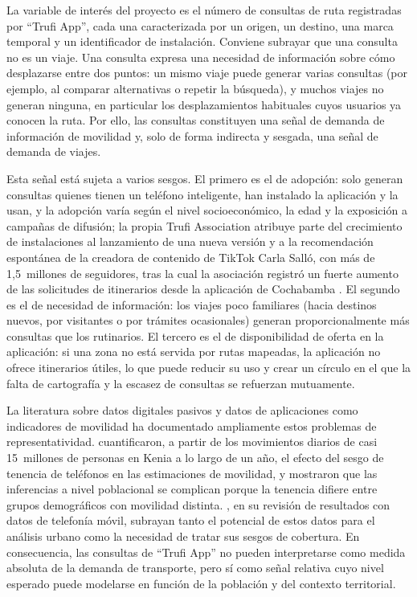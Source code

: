 La variable de interés del proyecto es el número de consultas de ruta registradas por ``Trufi App'', cada una caracterizada por un origen, un destino, una marca temporal y un identificador
de instalación. Conviene subrayar que una consulta no es un viaje. Una consulta expresa una
necesidad de información sobre cómo desplazarse entre dos puntos: un mismo viaje puede
generar varias consultas (por ejemplo, al comparar alternativas o repetir la búsqueda), y
muchos viajes no generan ninguna, en particular los desplazamientos habituales cuyos
usuarios ya conocen la ruta. Por ello, las consultas constituyen una señal de demanda de
información de movilidad y, solo de forma indirecta y sesgada, una señal de demanda de
viajes.

Esta señal está sujeta a varios sesgos. El primero es el de adopción: solo generan
consultas quienes tienen un teléfono inteligente, han instalado la aplicación y la usan, y
la adopción varía según el nivel socioeconómico, la edad y la exposición a campañas de
difusión; la propia Trufi Association atribuye parte del crecimiento de instalaciones al
lanzamiento de una nueva versión y a la recomendación espontánea de la creadora de
contenido de TikTok Carla Salló, con más de 1,5~millones de seguidores, tras la cual la
asociación registró un fuerte aumento de las solicitudes de itinerarios desde la aplicación
de Cochabamba \parencite{trufi-20000}. El segundo es el de necesidad de información: los
viajes poco familiares (hacia destinos nuevos, por visitantes o por trámites ocasionales)
generan proporcionalmente más consultas que los rutinarios. El tercero es el de
disponibilidad de oferta en la aplicación: si una zona no está servida por rutas mapeadas,
la aplicación no ofrece itinerarios útiles, lo que puede reducir su uso y crear un círculo
en el que la falta de cartografía y la escasez de consultas se refuerzan mutuamente.

La literatura sobre datos digitales pasivos y datos de aplicaciones como indicadores de
movilidad ha documentado ampliamente estos problemas de representatividad.
\textcite{wesolowski2013} cuantificaron, a partir de los movimientos diarios de casi
15~millones de personas en Kenia a lo largo de un año, el efecto del sesgo de tenencia de
teléfonos en las estimaciones de movilidad, y mostraron que las inferencias a nivel
poblacional se complican porque la tenencia difiere entre grupos demográficos con movilidad
distinta. \textcite{blondel2015}, en su revisión de resultados con datos de telefonía
móvil, subrayan tanto el potencial de estos datos para el análisis urbano como la necesidad
de tratar sus sesgos de cobertura. En consecuencia, las consultas de ``Trufi App'' no pueden
interpretarse como medida absoluta de la demanda de transporte, pero sí como señal relativa
cuyo nivel esperado puede modelarse en función de la población y del contexto territorial.

